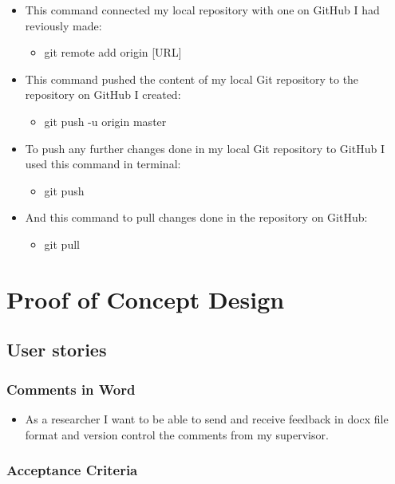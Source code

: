 \documentclass{article}
\begin{document}
\begin{itemize}
    \item This command connected my local repository with one on GitHub I had reviously made:
    \begin{itemize}
        \item git remote add origin [URL]
    \end{itemize}
    \item This command pushed the content of my local Git repository to the repository on GitHub I created:
    \begin{itemize}
        \item git push -u origin master
    \end{itemize}
    \item To push any further changes done in my local Git repository to GitHub I used this command in terminal:
    \begin{itemize}
        \item git push
    \end{itemize}
    \item And this command to pull changes done in the repository on GitHub:
    \begin{itemize}
        \item git pull
    \end{itemize}
    
\end{itemize}

\section{Proof of Concept Design}

\subsection{User stories}

\subsubsection{Comments in Word}

\begin{itemize}
    \item As a researcher I want to be able to send and receive feedback in docx file format and version control the comments from my supervisor.
\end{itemize}

\subsubsection{Acceptance Criteria}
\end{document}
